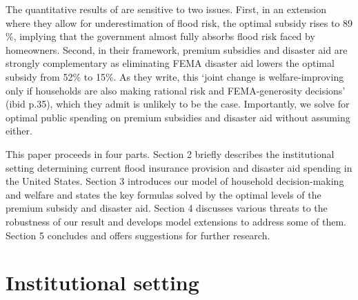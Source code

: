 \documentclass[12pt]{article}
\begin{document}
The quantitative results of \cite{gruber2026optimal} are sensitive to two issues. First, in an extension where they allow for underestimation of flood risk, the optimal subsidy rises to 89$\%$, implying that the government almost fully absorbs flood risk faced by homeowners. Second, in their framework, premium subsidies and disaster aid are strongly complementary as eliminating FEMA disaster aid lowers the optimal subsidy from 52$\%$ to 15$\%$. As they write, this `joint change is welfare-improving only if households are also making rational risk and FEMA-generosity decisions' (ibid p.35), which they admit is unlikely to be the case. Importantly, we solve for  optimal public spending on premium subsidies and disaster aid without assuming either.

This paper proceeds in four parts. Section 2 briefly describes the institutional setting determining current flood insurance provision and disaster aid spending in the United States. Section 3 introduces our model of household decision-making and welfare and states the key formulas solved by the optimal levels of the premium subsidy and disaster aid. Section 4 discusses various threats to the robustness of our result and develops model extensions to address some of them. Section 5 concludes and offers suggestions for further research.    



\section{Institutional setting}
\end{document}
